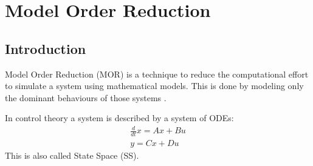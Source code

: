 \chapter{Model Order Reduction}
\section{Introduction}
Model Order Reduction (MOR) is a technique to reduce the computational effort to simulate a system using mathematical models.
This is done by modeling only the dominant behaviours of those systems \cite{+2021}.






In control theory a system is described by a system of ODEs:
\begin{gather}
\frac{d}{dt} x = Ax + Bu \\
y = Cx + Du
\end{gather}
This is also called State Space (SS).

